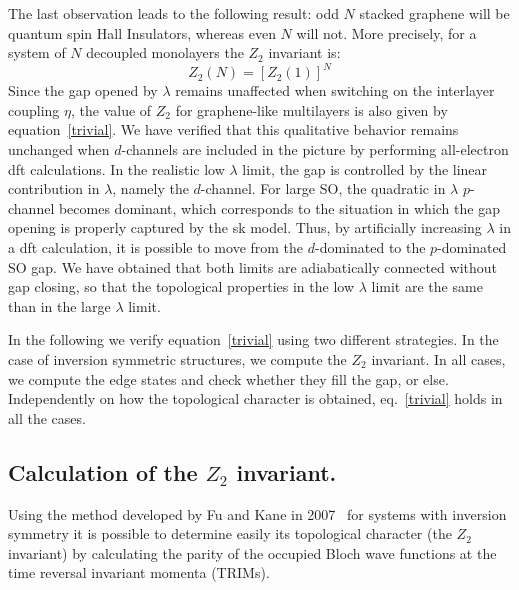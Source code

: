The last observation leads to the following result: odd $N$ stacked graphene will be quantum spin Hall Insulators, whereas  even $N$ will not. More precisely, for a system of $N$ decoupled monolayers the $Z_{2}$ invariant is:
\begin{equation}
 Z_{2}(N) = \left[Z_{2}(1)\right]^{N}
 \label{trivial}
\end{equation}
Since the gap opened by $\lambda$ remains unaffected when switching on the interlayer coupling $\eta$, the value of $Z_2$ for graphene-like multilayers is also given by equation~\eqref{trivial}.
We have verified that this qualitative behavior remains unchanged when $d$-channels are included in the picture by performing all-electron \ac{dft} calculations. %
In the realistic low $\lambda$ limit, the gap is controlled by the linear contribution in $\lambda$, namely the $d$-channel. For large SO, the quadratic in $\lambda$ $p$-channel becomes dominant, which corresponds to the situation in which the gap opening is properly captured by the \ac{sk} model.
Thus, by artificially increasing $\lambda$ in a \ac{dft} calculation, it is possible to move from the $d$-dominated to the $p$-dominated SO gap. We have obtained that both limits are adiabatically connected without gap closing, so that the topological properties in the low $\lambda$ limit are the same than in the large $\lambda$ limit.

In the following we verify equation~\eqref{trivial} using two different strategies. In the case of inversion symmetric structures, we compute the $Z_2$ invariant. In all cases, we compute the edge states and check whether they fill the gap, or else.  Independently on how the topological character is obtained, eq.~\eqref{trivial} holds in all the cases.



\subsection{Calculation of the $Z_{2}$ invariant.}
Using the method developed by Fu and Kane in 2007~\cite{Fu2007} for systems with
inversion symmetry it is possible to determine easily its topological character
(the $Z_{2}$ invariant) by calculating the parity of the occupied Bloch wave
functions at the time reversal invariant momenta (TRIMs).

